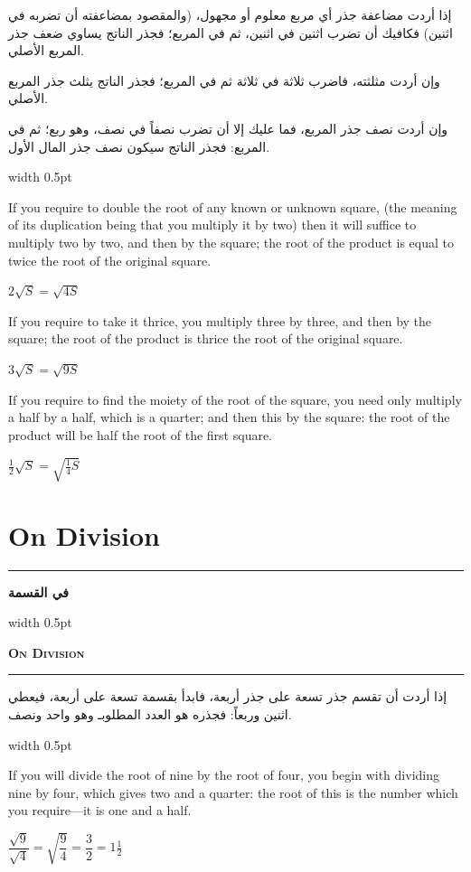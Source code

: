 \documentclass[10pt,a4paper]{book}
\newlength{\colwidth}
\newcommand{\bilingualpair}[2]{%
  \noindent
  \begin{minipage}[t]{\colwidth}
  \begin{flushright}
  \vspace{0pt}
  {\arabicfont\small #1}
  \end{flushright}
  \end{minipage}%
  \hfill\textcolor{columnsepclr}{\vrule width 0.5pt}\hfill
  \begin{minipage}[t]{\colwidth}
  \vspace{0pt}
  {\small #2}
  \end{minipage}%
  \par\vspace{0.6em}
}
\newcommand{\bilingualsectionheader}[2]{%
  \par\vspace{0.8em}
  \noindent
  \begin{minipage}[t]{\colwidth}
  \begin{flushright}
  \textbf{\arabicfont #1}
  \end{flushright}
  \end{minipage}%
  \hfill\textcolor{columnsepclr}{\vrule width 0.5pt}\hfill
  \begin{minipage}[t]{\colwidth}
  \textbf{\textsc{#2}}
  \end{minipage}%
  \par\vspace{0.5em}
}
\begin{document}
\bilingualpair{
إذا أردت مضاعفة جذر أي مربع معلوم أو مجهول، (والمقصود
بمضاعفته أن تضربه في اثنين) فكافيك أن تضرب اثنين في
اثنين، ثم في المربع؛ فجذر الناتج يساوي ضعف جذر المربع
الأصلي.

وإن أردت مثلثته، فاضرب ثلاثة في ثلاثة ثم في المربع؛ فجذر
الناتج يثلث جذر المربع الأصلي.

وإن أردت نصف جذر المربع، فما عليك إلا أن تضرب نصفاً في
نصف، وهو ربع؛ ثم في المربع: فجذر الناتج سيكون نصف جذر
المال الأول.
}{
If you require to double the root of any known or unknown square, (the
meaning of its duplication being that you multiply it by two) then it will
suffice to multiply two by two, and then by the square; the root of the
product is equal to twice the root of the original square.

$2\sqrt{S} = \sqrt{4S}$

If you require to take it thrice, you multiply three by three, and then by
the square; the root of the product is thrice the root of the original
square.

$3\sqrt{S} = \sqrt{9S}$

If you require to find the moiety of the root of the square, you need only
multiply a half by a half, which is a quarter; and then this by the square:
the root of the product will be half the root of the first square.

$\tfrac{1}{2}\sqrt{S} = \sqrt{\tfrac{1}{4}S}$
}

\newpage

\chapter{On Division}
\label{ch:division}

\noindent\textcolor{columnsepclr}{\rule{\textwidth}{0.6pt}}\par\vspace{0.3em}
\bilingualsectionheader{في القسمة}{On Division}
\noindent\textcolor{columnsepclr}{\rule{\textwidth}{0.6pt}}\par\vspace{0.5em}

\bilingualpair{
إذا أردت أن تقسم جذر تسعة على جذر أربعة، فابدأ بقسمة تسعة
على أربعة، فيعطي اثنين وربعاً: فجذره هو العدد المطلوبـ
وهو واحد ونصف.
}{
If you will divide the root of nine by the root of four, you begin with
dividing nine by four, which gives two and a quarter: the root of this is the
number which you require---it is one and a half.

$\dfrac{\sqrt{9}}{\sqrt{4}} = \sqrt{\dfrac{9}{4}} = \dfrac{3}{2} = 1\tfrac{1}{2}$
}
\end{document}
